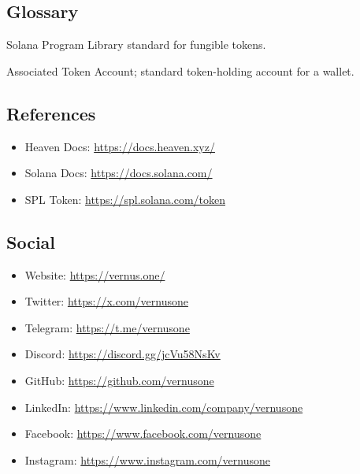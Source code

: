 \documentclass[10pt]{article}
\begin{document}
    \subsection{Glossary}
      \begin{description}[leftmargin=2em]
        \item[SPL] Solana Program Library standard for fungible tokens.
        \item[ATA] Associated Token Account; standard token-holding account for a wallet.
      \end{description}

      \subsection{References}
        \begin{itemize}[leftmargin=*]
          \item Heaven Docs: \url{https://docs.heaven.xyz/}
          \item Solana Docs: \url{https://docs.solana.com/}
          \item SPL Token: \url{https://spl.solana.com/token}
        \end{itemize}

    \subsection{Social }
      \begin{itemize}[leftmargin=*]
        \item Website: \url{https://vernus.one/}
        \item Twitter: \url{https://x.com/vernusone}
        \item Telegram: \url{https://t.me/vernusone}
        \item Discord: \url{https://discord.gg/jcVu58NsKv}
        \item GitHub: \url{https://github.com/vernusone}
        \item LinkedIn: \url{https://www.linkedin.com/company/vernusone}
        \item Facebook: \url{https://www.facebook.com/vernusone}
        \item Instagram: \url{https://www.instagram.com/vernusone}
      \end{itemize}

  \clearpage
  \thispagestyle{empty}
  \vspace*{\fill}

  \begin{center}
  \end{center}

  \vspace*{\fill}
\end{document}
